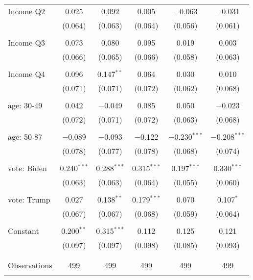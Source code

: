 \begin{tabular}{@{\extracolsep{5pt}}lccccc}
 Income Q2 & 0.025 & 0.092 & 0.005 & $-$0.063 & $-$0.031 \\ 
  & (0.064) & (0.063) & (0.064) & (0.056) & (0.061) \\ 
  & & & & & \\ 
 Income Q3 & 0.073 & 0.080 & 0.095 & 0.019 & 0.003 \\ 
  & (0.066) & (0.065) & (0.066) & (0.058) & (0.063) \\ 
  & & & & & \\ 
 Income Q4 & 0.096 & 0.147$^{**}$ & 0.064 & 0.030 & 0.010 \\ 
  & (0.071) & (0.071) & (0.072) & (0.062) & (0.068) \\ 
  & & & & & \\ 
 age: 30-49 & 0.042 & $-$0.049 & 0.085 & 0.050 & $-$0.023 \\ 
  & (0.072) & (0.071) & (0.072) & (0.063) & (0.068) \\ 
  & & & & & \\ 
 age: 50-87 & $-$0.089 & $-$0.093 & $-$0.122 & $-$0.230$^{***}$ & $-$0.208$^{***}$ \\ 
  & (0.078) & (0.077) & (0.078) & (0.068) & (0.074) \\ 
  & & & & & \\ 
 vote: Biden & 0.240$^{***}$ & 0.288$^{***}$ & 0.315$^{***}$ & 0.197$^{***}$ & 0.330$^{***}$ \\ 
  & (0.063) & (0.063) & (0.064) & (0.055) & (0.060) \\ 
  & & & & & \\ 
 vote: Trump & 0.027 & 0.138$^{**}$ & 0.179$^{***}$ & 0.070 & 0.107$^{*}$ \\ 
  & (0.067) & (0.067) & (0.068) & (0.059) & (0.064) \\ 
  & & & & & \\ 
 Constant & 0.200$^{**}$ & 0.315$^{***}$ & 0.112 & 0.125 & 0.121 \\ 
  & (0.097) & (0.097) & (0.098) & (0.085) & (0.093) \\ 
  & & & & & \\ 
\hline \\[-1.8ex] 

Observations & 499 & 499 & 499 & 499 & 499 \\ 
\hline 
\hline \\[-1.8ex] 
\end{tabular} 
